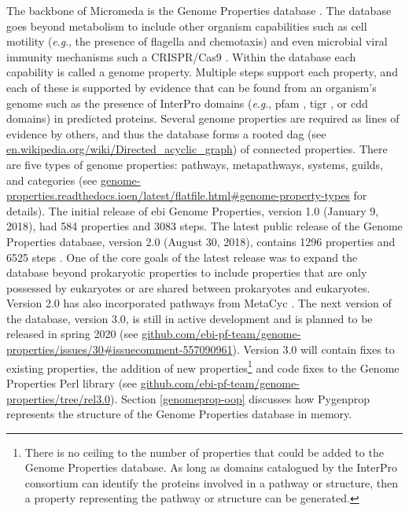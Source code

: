 The backbone of Micromeda is the Genome Properties database \cite{Haft2013}. The 
database goes beyond metabolism to include other organism capabilities such as 
cell motility (\textit{e}.\textit{g}., the presence of flagella and chemotaxis) 
and even microbial viral immunity mechanisms such a CRISPR/Cas9 
\cite{horvath2010crispr}. Within the database each capability is called a genome 
property. Multiple steps support each property, and each of these is supported 
by evidence that can be found from an organism's genome such as the presence of 
InterPro domains (\textit{e}.\textit{g}., \gls{pfam} \cite{bateman2004pfam}, 
\gls{tigr} \cite{haft2001tigrfams}, or \gls{cdd} \cite{marchler2014cdd} domains) 
in predicted proteins. Several genome properties are required as lines of 
evidence by others, and thus the database forms a rooted \gls{dag} (see 
\href{http://en.wikipedia.org/wiki/Directed_acyclic_graph}{en.wikipedia.org/wiki/Directed\_acyclic\_graph}) 
of connected properties. There are five types of genome properties: pathways, 
metapathways, systems, guilds, and categories (see 
\href{http://genome-properties.readthedocs.io/en/latest/flatfile.html#genome-property-types}{genome-properties.readthedocs.ioen/latest/flatfile.html\#genome-property-types} 
for details). The initial release of \gls{ebi} Genome Properties, version 1.0 
(January 9, 2018), had 584 properties and 3083 steps. The latest public release 
of the Genome Properties database, version 2.0 (August 30, 2018), contains 1296 
properties and 6525 steps \cite{richardson2018genome}. One of the core goals of 
the latest release was to expand the database beyond prokaryotic properties to 
include properties that are only possessed by eukaryotes or are shared between 
prokaryotes and eukaryotes. Version 2.0 has also incorporated pathways from 
MetaCyc \cite{karp2002metacyc}. The next version of the database, version 3.0, 
is still in active development and is planned to be released in spring 2020 (see 
\href{http://github.com/ebi-pf-team/genome-properties/issues/30#issuecomment-557090961}{github.com/ebi-pf-team/genome-properties/issues/30\#issuecomment-557090961}). 
Version 3.0 will contain fixes to existing properties, the addition of new 
properties\footnote{There is no ceiling to the number of properties that could 
be added to the Genome Properties database. As long as domains catalogued by the 
InterPro consortium can identify the proteins involved in a pathway or 
structure, then a property representing the pathway or structure can be 
generated.} and code fixes to the Genome Properties Perl library (see 
\href{http://github.com/ebi-pf-team/genome-properties/tree/rel3.0}{github.com/ebi-pf-team/genome-properties/tree/rel3.0}). 
Section \ref{genomeprop-oop} discusses how Pygenprop represents the structure of 
the Genome Properties database in memory.

